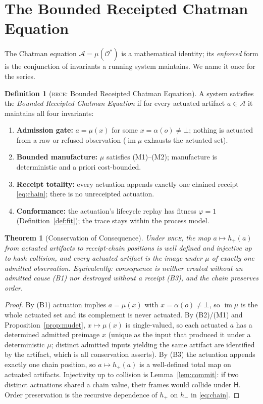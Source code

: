 \documentclass[11pt,oneside]{book}
\theoremstyle{definition}
\newtheorem{definition}{Definition}[chapter]
\theoremstyle{plain}
\newtheorem{theorem}{Theorem}[chapter]
\theoremstyle{remark}
\newcommand{\Adm}{\mathcal{O}^{*}}             %
\newcommand{\Act}{\mathcal{A}}                 %
\newcommand{\muop}{\mu}                        %
\newcommand{\adm}{\alpha}                      %
\newcommand{\chainH}{\mathsf{H}}               %
\newcommand{\Rfsl}{\bot}                        %
\newcommand{\Fitness}{\varphi}
\DeclareMathOperator{\im}{im}
\newcommand{\BRCE}{\textsc{brce}}
\begin{document}
\section{The Bounded Receipted Chatman Equation}

The Chatman equation $\Act=\muop(\Adm)$ is a mathematical identity; its \emph{enforced} form
is the conjunction of invariants a running system maintains. We name it once for the series.

\begin{definition}[\BRCE: Bounded Receipted Chatman Equation]\label{def:brce}
A system satisfies the \emph{Bounded Receipted Chatman Equation} if for every actuated
artifact $a\in\Act$ it maintains all four invariants:
\begin{enumerate}[label=(B\arabic*),leftmargin=*]
  \item \textbf{Admission gate:} $a=\muop(x)$ for some $x=\adm(o)\neq\Rfsl$; nothing is
        actuated from a raw or refused observation ($\im\muop$ exhausts the actuated set).
  \item \textbf{Bounded manufacture:} $\muop$ satisfies (M1)--(M2); manufacture is
        deterministic and a priori cost-bounded.
  \item \textbf{Receipt totality:} every actuation appends exactly one chained receipt
        \eqref{eq:chain}; there is no unreceipted actuation.
  \item \textbf{Conformance:} the actuation's lifecycle replay has fitness $\Fitness=1$
        (Definition~\ref{def:fit}); the trace stays within the process model.
\end{enumerate}
\end{definition}

\begin{theorem}[Conservation of Consequence]\label{thm:conservation}
Under \BRCE, the map $a\mapsto h_{+}(a)$ from actuated artifacts to receipt-chain positions
is well defined and injective up to hash collision, and every actuated artifact is the image
under $\muop$ of exactly one admitted observation. Equivalently: consequence is neither
created without an admitted cause (B1) nor destroyed without a receipt (B3), and the chain
preserves order.
\end{theorem}

\begin{proof}
By (B1) actuation implies $a=\muop(x)$ with $x=\adm(o)\neq\Rfsl$, so $\im\muop$ is the whole
actuated set and its complement is never actuated. By (B2)/(M1) and
Proposition~\ref{prop:mudet}, $x\mapsto\muop(x)$ is single-valued, so each actuated $a$ has a
determined admitted preimage $x$ (unique as the input that produced it under a deterministic
$\muop$; distinct admitted inputs yielding the same artifact are identified by the artifact,
which is all conservation asserts). By (B3) the actuation appends exactly one chain position,
so $a\mapsto h_{+}(a)$ is a well-defined total map on actuated artifacts. Injectivity up to
collision is Lemma~\ref{lem:commit}: if two distinct actuations shared a chain value, their
frames would collide under $\chainH$. Order preservation is the recursive dependence of
$h_{+}$ on $h_{-}$ in \eqref{eq:chain}. \end{proof}
\end{document}
